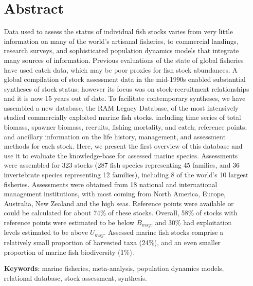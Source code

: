 \section*{Abstract}

Data used to assess the status of individual fish stocks varies from
very little information on many of the world's artisanal fisheries, to
commercial landings, research surveys, and sophisticated population
dynamics models that integrate many sources of information.  Previous
evaluations of the state of global fisheries have used catch data,
which may be poor proxies for fish stock abundances. A global
compilation of stock assessment data in the mid-1990s enabled
substantial syntheses of stock status; however its focus was on
stock-recruitment relationships and it is now 15 years out of date. To
facilitate contemporary syntheses, we have assembled a new database,
the RAM Legacy Database, of the most intensively studied commercially
exploited marine fish stocks, including time series of total biomass,
spawner biomass, recruits, fishing mortality, and catch; reference
points; and ancillary information on the life history, management, and
assessment methods for each stock.  Here, we present the first
overview of this database and use it to evaluate the knowledge-base
for assessed marine species.  Assessments were assembled for
323 stocks (287 fish species
representing 45 families, and
36 invertebrate species representing
12 families), including 8 of the world's 10
largest fisheries. Assessments were obtained from 18 national and
international management institutions, with most coming from North
America, Europe, Australia, New Zealand and the high seas. Reference
points were available or could be calculated for about
74\% of these stocks. Overall, 58\% of
stocks with reference points were estimated to be below $B_{msy}$, and
30\% had exploitation levels estimated to be above $U_{msy}$.
Assessed marine fish stocks comprise a relatively small proportion of
harvested taxa (24\%), and an even smaller proportion of marine fish
biodiversity (1\%).



\noindent \textbf{Keywords}: marine fisheries, meta-analysis, population dynamics models, relational database, stock assessment, synthesis.


